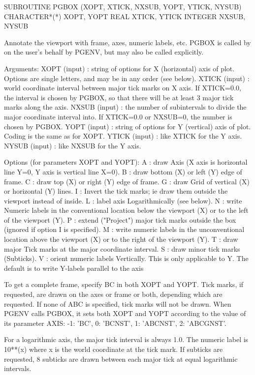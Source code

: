 {\eightpoint\begintt
      SUBROUTINE PGBOX (XOPT, XTICK, NXSUB, YOPT, YTICK, NYSUB)
      CHARACTER*(*) XOPT, YOPT
      REAL XTICK, YTICK
      INTEGER NXSUB, NYSUB
 
Annotate the viewport with frame, axes, numeric labels, etc.
PGBOX is called by on the user's behalf by PGENV, but may also be
called explicitly.
 
Arguments:
 XOPT   (input)  : string of options for X (horizontal) axis of
                   plot. Options are single letters, and may be in
                   any order (see below).
 XTICK  (input)  : world coordinate interval between major tick marks
                   on X axis. If XTICK=0.0, the interval is chosen by
                   PGBOX, so that there will be at least 3 major tick
                   marks along the axis.
 NXSUB  (input)  : the number of subintervals to divide the major
                   coordinate interval into. If XTICK=0.0 or NXSUB=0,
                   the number is chosen by PGBOX.
 YOPT   (input)  : string of options for Y (vertical) axis of plot.
                   Coding is the same as for XOPT.
 YTICK  (input)  : like XTICK for the Y axis.
 NYSUB  (input)  : like NXSUB for the Y axis.
 
Options (for parameters XOPT and YOPT):
 A : draw Axis (X axis is horizontal line Y=0, Y axis is vertical
     line X=0).
 B : draw bottom (X) or left (Y) edge of frame.
 C : draw top (X) or right (Y) edge of frame.
 G : draw Grid of vertical (X) or horizontal (Y) lines.
 I : Invert the tick marks; ie draw them outside the viewport
     instead of inside.
 L : label axis Logarithmically (see below).
 N : write Numeric labels in the conventional location below the
     viewport (X) or to the left of the viewport (Y).
 P : extend ("Project") major tick marks outside the box (ignored if
     option I is specified).
 M : write numeric labels in the unconventional location above the
     viewport (X) or to the right of the viewport (Y).
 T : draw major Tick marks at the major coordinate interval.
 S : draw minor tick marks (Subticks).
 V : orient numeric labels Vertically. This is only applicable to Y.
     The default is to write Y-labels parallel to the axis
 
To get a complete frame, specify BC in both XOPT and YOPT.
Tick marks, if requested, are drawn on the axes or frame
or both, depending which are requested. If none of ABC is specified,
tick marks will not be drawn. When PGENV calls PGBOX, it sets both
XOPT and YOPT according to the value of its parameter AXIS:
-1: 'BC', 0: 'BCNST', 1: 'ABCNST', 2: 'ABCGNST'.
 
For a logarithmic axis, the major tick interval is always 1.0. The
numeric label is 10**(x) where x is the world coordinate at the
tick mark. If subticks are requested, 8 subticks are drawn between
each major tick at equal logarithmic intervals.
\endtt}

